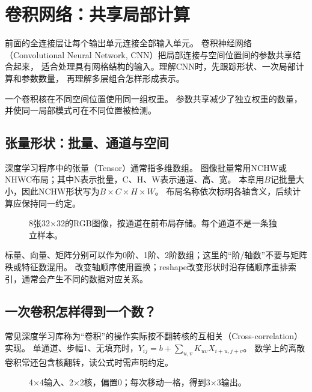 \chapter{卷积网络：共享局部计算}
\label{ch:cnn}

前面的全连接层让每个输出单元连接全部输入单元。
卷积神经网络（Convolutional Neural Network, CNN）把局部连接与空间位置间的参数共享结合起来，
适合处理具有网格结构的输入。理解CNN时，先跟踪形状、一次局部计算和参数数量，
再理解多层组合怎样形成表示。

\begin{keyidea}
一个卷积核在不同空间位置使用同一组权重。
参数共享减少了独立权重的数量，并使同一局部模式可在不同位置被检测。
\end{keyidea}

\section{张量形状：批量、通道与空间}
\label{sec:cnn-tensor}
深度学习程序中的张量（Tensor）通常指多维数组。
图像批量常用NCHW或NHWC布局；其中N表示批量，C、H、W表示通道、高、宽。
本章用$B$记批量大小，因此NCHW形状写为$B\times C\times H\times W$。
布局名称依次标明各轴含义，后续计算应保持同一约定。

\begin{figure}[htbp]
\centering
\caption{8张32$\times$32的RGB图像，按通道在前布局存储。每个通道不是一条独立样本。}
\par\smallskip
{}
\end{figure}

标量、向量、矩阵分别可以作为0阶、1阶、2阶数组；这里的“阶/轴数”不要与矩阵秩或特征数混用。
改变轴顺序使用置换；reshape改变形状时沿存储顺序重排索引，通常会产生不同的数据对应关系。


\section{一次卷积怎样得到一个数？}
\label{sec:cnn-convolution}
常见深度学习库称为“卷积”的操作实际按不翻转核的互相关（Cross-correlation）实现。
单通道、步幅1、无填充时，$Y_{ij}=b+\sum_{u,v}K_{uv}X_{i+u,j+v}$。
数学上的离散卷积常还包含核翻转，读公式时需声明约定。

\begin{figure}[htbp]
\centering
\caption{4$\times$4输入、2$\times$2核，偏置0；每次移动一格，得到3$\times$3输出。}
\par\smallskip
{}
\end{figure}

